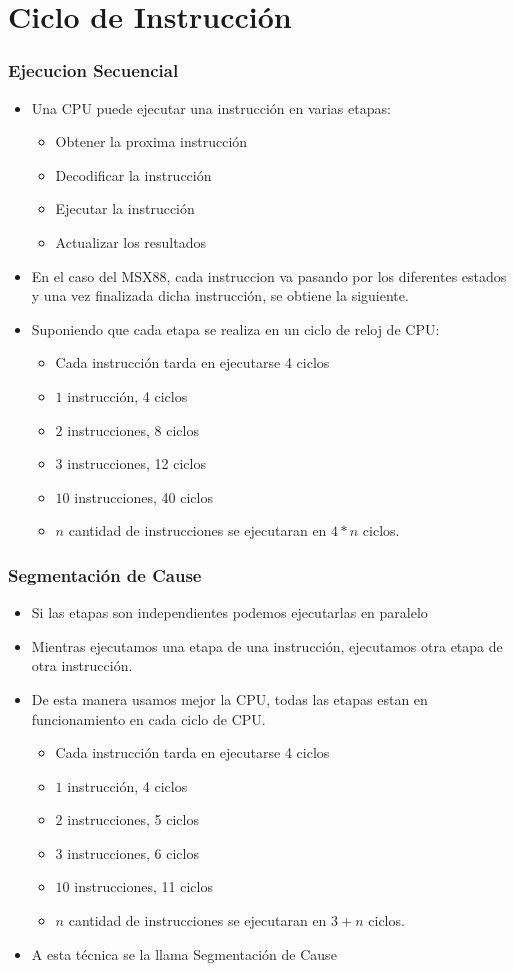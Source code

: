 \documentclass{beamer}
\begin{document}
\section{Ciclo de Instrucción}
\begin{frame}
\frametitle{Ejecucion Secuencial}
\begin{itemize}
\item Una CPU puede ejecutar una instrucción en varias etapas:
\begin{itemize}
  \item Obtener la proxima instrucción
  \item Decodificar la instrucción
  \item Ejecutar la instrucción
  \item Actualizar los resultados
\end{itemize}
\item En el caso del MSX88, cada instruccion va pasando por los diferentes estados y una vez finalizada dicha instrucción, se obtiene la siguiente.
\item Suponiendo que cada etapa se realiza en un ciclo de reloj de CPU:
\begin{itemize}
  \item Cada instrucción tarda en ejecutarse 4 ciclos
  \item $1$ instrucción, 4 ciclos
  \item $2$ instrucciones, 8 ciclos
  \item $3$ instrucciones, 12 ciclos
  \item $10$ instrucciones, 40 ciclos
  \item $n$ cantidad de instrucciones se ejecutaran en $4 * n$ ciclos.
\end{itemize}
\end{itemize}
\end{frame}

\begin{frame}
\frametitle{Segmentación de Cause}
\begin{itemize}
\item Si las etapas son independientes podemos ejecutarlas en paralelo
\item Mientras ejecutamos una etapa de una instrucción, ejecutamos otra etapa de otra instrucción.
\item De esta manera usamos mejor la CPU, todas las etapas estan en funcionamiento en cada ciclo de CPU.
\begin{itemize}
  \item Cada instrucción tarda en ejecutarse 4 ciclos
  \item $1$ instrucción, 4 ciclos
  \item $2$ instrucciones, 5 ciclos
  \item $3$ instrucciones, 6 ciclos
  \item $10$ instrucciones, 11 ciclos
  \item $n$ cantidad de instrucciones se ejecutaran en $3 + n$ ciclos.
\end{itemize}
\item A esta técnica se la llama Segmentación de Cause
\end{itemize}
\end{frame}
\end{document}
